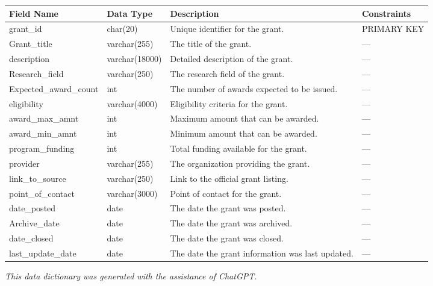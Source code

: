 \documentclass[12pt]{article}
\begin{document}
\begin{longtable}{@{}p{4cm}p{3cm}p{6cm}p{3cm}@{}}
\toprule
\textbf{Field Name} & \textbf{Data Type} & \textbf{Description} & \textbf{Constraints} \\ \midrule
\endhead
grant\_id & char(20) & Unique identifier for the grant. & PRIMARY KEY \\
Grant\_title & varchar(255) & The title of the grant. & --- \\
description & varchar(18000) & Detailed description of the grant. & --- \\
Research\_field & varchar(250) & The research field of the grant. & --- \\
Expected\_award\_count & int & The number of awards expected to be issued. & --- \\
eligibility & varchar(4000) & Eligibility criteria for the grant. & --- \\
award\_max\_amnt & int & Maximum amount that can be awarded. & --- \\
award\_min\_amnt & int & Minimum amount that can be awarded. & --- \\
program\_funding & int & Total funding available for the grant. & --- \\
provider & varchar(255) & The organization providing the grant. & --- \\
link\_to\_source & varchar(250) & Link to the official grant listing. & --- \\
point\_of\_contact & varchar(3000) & Point of contact for the grant. & --- \\
date\_posted & date & The date the grant was posted. & --- \\
Archive\_date & date & The date the grant was archived. & --- \\
date\_closed & date & The date the grant was closed. & --- \\
last\_update\_date & date & The date the grant information was last updated. & --- \\
\bottomrule
\end{longtable}

\vfill
\begin{center}
    {\footnotesize \textit{This data dictionary was generated with the assistance of ChatGPT.}}
\end{center}
\end{document}
